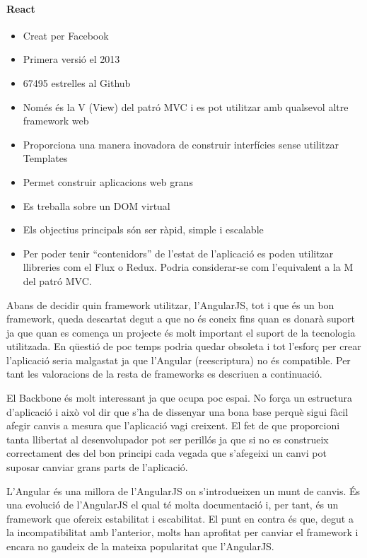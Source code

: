 \documentclass[12pt, titlepage]{article}
\begin{document}
\paragraph{React}
\begin{itemize}
\item Creat per Facebook
\item Primera versió el 2013
\item 67495 estrelles al Github
\item Només és la V (View) del patró MVC i es pot utilitzar amb qualsevol altre framework web
\item Proporciona una manera inovadora de construir interfícies sense utilitzar Templates
\item Permet construir aplicacions web grans
\item Es treballa sobre un DOM virtual
\item Els objectius principals són ser ràpid, simple i escalable
\item Per poder tenir “contenidors” de l’estat de l’aplicació es poden utilitzar
llibreries com el Flux o Redux. Podria considerar-se com l’equivalent a la M del patró MVC.
\end{itemize}

Abans de decidir quin framework utilitzar, l’AngularJS, tot i que és un bon framework,
queda descartat degut a que no és coneix fins quan es donarà suport ja que quan es comença
un projecte és molt important el suport de la tecnologia utilitzada. En qüestió de
poc temps podria quedar obsoleta i tot l’esforç per crear l’aplicació seria malgastat
ja que l’Angular (reescriptura) no és compatible. Per tant les valoracions de la resta
de frameworks es descriuen a continuació.

El Backbone és molt interessant ja que ocupa poc espai. No força un estructura
d’aplicació i això vol dir que s’ha de dissenyar una bona base perquè sigui fàcil
afegir canvis a mesura que l’aplicació vagi creixent. El fet de que proporcioni
tanta llibertat al desenvolupador pot ser perillós ja que si no es construeix
correctament des del bon principi cada vegada que s’afegeixi un canvi pot suposar
canviar grans parts de l’aplicació.

L’Angular és una millora de l’AngularJS on s’introdueixen un munt de canvis. És
una evolució de l’AngularJS el qual té molta documentació i, per tant, és un
framework que ofereix estabilitat i escabilitat. El punt en contra és que, degut
a la incompatibilitat amb l’anterior, molts han aprofitat per canviar el framework
i encara no gaudeix de la mateixa popularitat que l’AngularJS.
\end{document}
